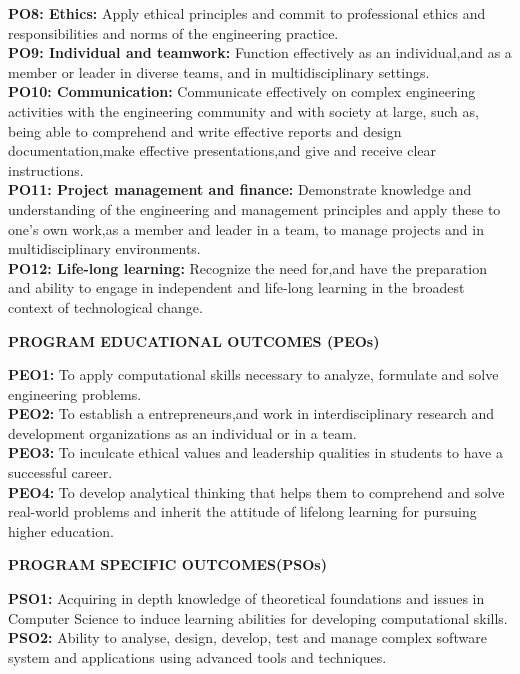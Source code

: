 \textbf{PO8: Ethics:} Apply ethical principles and commit to professional ethics and responsibilities and norms of the engineering practice.\\[2mm]
\textbf{PO9: Individual and teamwork:} Function effectively as an individual,and as a member or leader in diverse teams, and in multidisciplinary settings.\\[2mm]
\textbf{PO10: Communication:} Communicate effectively on complex engineering activities with the engineering community and with society at large, such as, being able to comprehend and write effective reports and design documentation,make effective presentations,and give and receive clear instructions.\\[2mm]
\textbf{PO11: Project management and finance:} Demonstrate knowledge and understanding of the engineering and management principles and apply these to one’s own work,as a member and leader in a team, to manage projects and in multidisciplinary environments.\\[2mm]
\textbf{PO12: Life-long learning:} Recognize the need for,and have the preparation and ability to engage in independent and life-long learning in the broadest context of technological change.

\vspace{5mm}
\noindent\textbf{PROGRAM EDUCATIONAL OUTCOMES (PEOs)}

\vspace{3mm}
\noindent\textbf{PEO1:} To apply computational skills necessary to analyze, formulate and solve engineering problems.\\[2mm]
\textbf{PEO2:} To establish a entrepreneurs,and work in interdisciplinary research and development organizations as an individual or in a team.\\[2mm]
\textbf{PEO3:} To inculcate ethical values and leadership qualities in students to have a successful career.\\[2mm]
\textbf{PEO4:} To develop analytical thinking that helps them to comprehend and solve real-world problems and inherit the attitude of lifelong learning for pursuing higher education.

\vspace{5mm}
\noindent\textbf{PROGRAM SPECIFIC OUTCOMES(PSOs)}

\vspace{3mm}
\noindent\textbf{PSO1:} Acquiring in depth knowledge of theoretical foundations and issues in Computer Science to induce learning abilities for developing computational skills.\\[2mm]
\textbf{PSO2:} Ability to analyse, design, develop, test and manage complex software system and applications using advanced tools and techniques.

